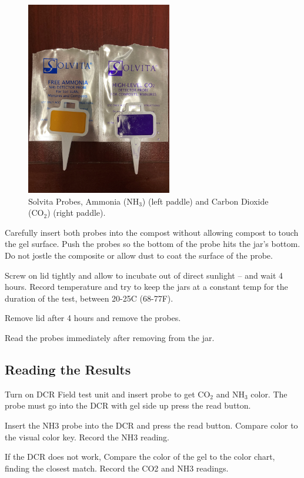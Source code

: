 \documentclass[12pt]{../SOP4_alpha}\usepackage[]{graphicx}\usepackage[]{xcolor}
\begin{document}
\begin{figure}[htbp]
   \centering
   \includegraphics[width=2.5in]{graphics/Solvita_Paddle_image} 
   \caption{Solvita Probes, Ammonia (NH$_3$) (left paddle) and Carbon Dioxide (CO$_2$) (right paddle).}
   \label{fig:Probes}
\end{figure}


\NP Carefully insert both probes into the compost without allowing compost to touch the gel surface. Push the probes so the bottom of the probe hits the jar's bottom. Do not jostle the composite or allow dust to coat the surface of the probe. 

\NP Screw on lid tightly and allow to incubate out of direct sunlight -- and wait 4 hours. Record temperature and try to keep the jars at a constant temp for the duration of the test, between 20-25\textdegree C (68-77\textdegree F).

\NP Remove lid after 4 hours and remove the probes. 

\NP Read the probes immediately after removing from the jar.


\subsection{Reading the Results}

\NP Turn on DCR Field test unit and insert probe to get CO$_2$ and NH$_3$ color. The probe must go into the DCR with gel side up press the read button. 

\NP Insert the NH3 probe into the DCR and press the read button. Compare color to the visual color key. Record the NH3 reading.

\NP If the DCR does not work, Compare the color of the gel to the color chart, finding the closest match. Record the CO2 and NH3 readings.
\end{document}

